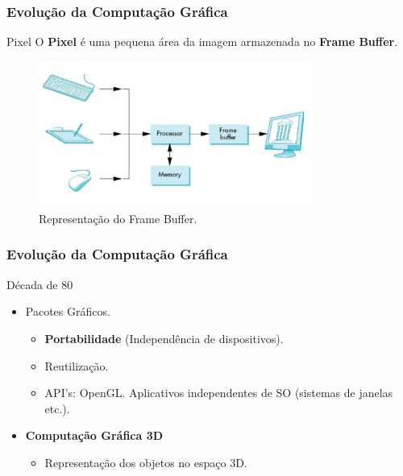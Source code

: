 \documentclass{beamer}
\begin{document}
\begin{frame}
\frametitle{Evolução da Computação Gráfica}

\begin{block} {Pixel}
	O \textbf{Pixel} é uma pequena área da imagem armazenada no \textbf{Frame Buffer}.
	
\end{block}

	\begin{figure}[!h]
		\begin{center}
			\includegraphics[width=0.8\textwidth]{Figures/framebuffer}
			\caption{Representação do Frame Buffer.}
		\end{center}
		
	\end{figure}

\end{frame}



\begin{frame}
\frametitle{Evolução da Computação Gráfica}

\begin{block}{Década de 80}
		\begin{itemize}
			\item<1-> Pacotes Gráficos.
				\begin{itemize}
					\item \textbf{Portabilidade} (Independência de dispositivos).
					\item Reutilização.
					\item API's: OpenGL. Aplicativos independentes de SO (sistemas de janelas etc.).
				\end{itemize}
			\item \textbf{Computação Gráfica 3D}
				\begin{itemize}
					\item Representação dos objetos no espaço 3D.
				\end{itemize}
			
		\end{itemize}
\end{block}

\end{frame}
\end{document}
